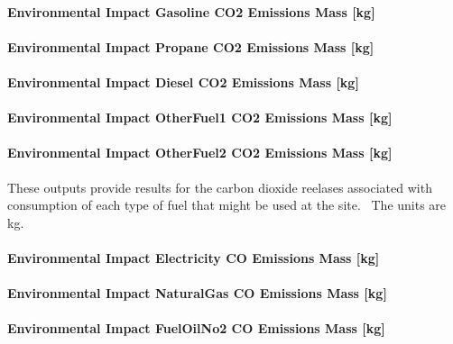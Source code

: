 \paragraph{Environmental Impact Gasoline CO2 Emissions Mass {[}kg{]}}\label{environmental-impact-gasoline-co2-emissions-mass-kg}

\paragraph{Environmental Impact Propane CO2 Emissions Mass {[}kg{]}}\label{environmental-impact-propane-co2-emissions-mass-kg}

\paragraph{Environmental Impact Diesel CO2 Emissions Mass {[}kg{]}}\label{environmental-impact-diesel-co2-emissions-mass-kg}

\paragraph{Environmental Impact OtherFuel1 CO2 Emissions Mass {[}kg{]}}\label{environmental-impact-otherfuel1-co2-emissions-mass-kg}

\paragraph{Environmental Impact OtherFuel2 CO2 Emissions Mass {[}kg{]}}\label{environmental-impact-otherfuel2-co2-emissions-mass-kg}

These outputs provide results for the carbon dioxide reelases associated with consumption of each type of fuel that might be used at the site.~ The units are kg.

\paragraph{Environmental Impact Electricity CO Emissions Mass {[}kg{]}}\label{environmental-impact-electricity-co-emissions-mass-kg}

\paragraph{Environmental Impact NaturalGas CO Emissions Mass {[}kg{]}}\label{environmental-impact-natural-gas-co-emissions-mass-kg}

\paragraph{Environmental Impact FuelOilNo2 CO Emissions Mass {[}kg{]}}\label{environmental-impact-fuel-oil-2-co-emissions-mass-kg}

